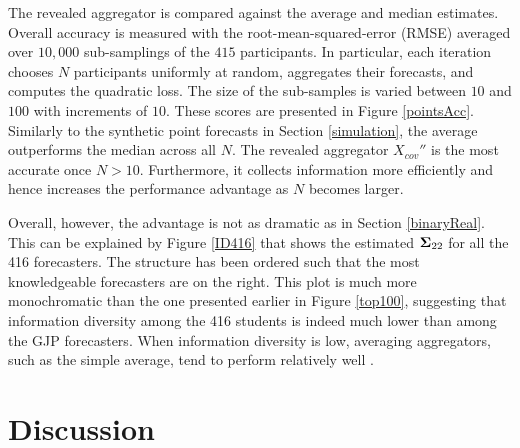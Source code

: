 \documentclass[11pt]{article}
\theoremstyle{definition}
\theoremstyle{definition}
\def\bSigma{{\bf \Sigma}}
\def\Z{{\bf Z}}
\begin{document}
The revealed aggregator is compared against the average and median estimates. Overall accuracy is measured with the root-mean-squared-error (RMSE) averaged over $10,000$ sub-samplings of the $415$ participants. In particular, each iteration chooses $N$ participants uniformly at random, aggregates their forecasts, and computes the quadratic loss. The size of the sub-samples is varied between $10$ and $100$ with increments of $10$. These scores are presented in Figure \ref{pointsAcc}. Similarly to the synthetic point forecasts in Section \ref{simulation}, the average outperforms the median across all $N$. The revealed aggregator $X_{cov}''$ is the most accurate once $N > 10$. Furthermore, it collects information more efficiently and hence increases the performance advantage as $N$ becomes larger. 

Overall, however, the advantage is not as dramatic as in Section \ref{binaryReal}. This can be explained by Figure \ref{ID416} that shows the estimated $\bSigma_{22}$ for all the 416 forecasters. The structure has been ordered such that the most knowledgeable forecasters are on the right. This plot is much more monochromatic than the one presented earlier in Figure \ref{top100}, suggesting that information diversity among the 416 students is indeed much lower than among the GJP forecasters. When information diversity is low, averaging aggregators, such as the simple average, tend to perform relatively well \citep{satopaamodeling}. 








\section{Discussion}
\label{discussion}
\end{document}
